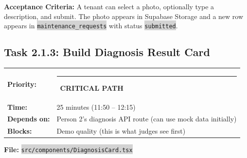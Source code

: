 \documentclass[11pt, a4paper]{article}
\newcommand{\critical}{\textcolor{critred}{\rule{6pt}{6pt}}~\textcolor{critred}{\scriptsize\textbf{CRITICAL PATH}}}
\newcommand{\code}[1]{\texttt{\small\colorbox{lightgray}{#1}}}
\begin{document}
\textbf{Acceptance Criteria:} A tenant can select a photo, optionally type a description, and submit. The photo appears in Supabase Storage and a new row appears in \code{maintenance\_requests} with status \code{submitted}.

\vspace{1em}

\subsection{Task 2.1.3: Build Diagnosis Result Card}

\begin{tabularx}{\textwidth}{lX}
\textbf{Priority:} & \critical \\
\textbf{Time:} & 25 minutes (11:50 -- 12:15) \\
\textbf{Depends on:} & Person 2's diagnosis API route (can use mock data initially) \\
\textbf{Blocks:} & Demo quality (this is what judges see first) \\
\end{tabularx}

\vspace{0.3em}

\textbf{File:} \code{src/components/DiagnosisCard.tsx}
\end{document}
